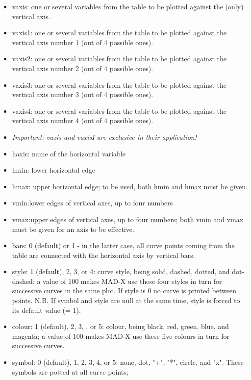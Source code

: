 \begin{itemize}
   \item vaxis: one or several variables from the table to be plotted
     against the (only) vertical axis.   
   \item vaxis1: one or several variables from the table to be plotted
     against the vertical axis number 1 (out of 4 possible ones).  
   \item vaxis2: one or several variables from the table to be plotted
     against the vertical axis number 2 (out of 4 possible ones).  
   \item vaxis3: one or several variables from the table to be plotted
     against the vertical axis number 3 (out of 4 possible ones).  
   \item vaxis4: one or several variables from the table to be plotted
     against the vertical axis number 4 (out of 4 possible ones).  
   \item \textit{Important: vaxis and vaxisI are exclusive in their
     application!} 
   \item haxis: name of the horizontal variable 
   \item hmin: lower horizontal edge 
   \item hmax: upper horizontal edge; to be used, both hmin and hmax
     must be given.   
   \item vmin:lower edges of vertical axes, up to four numbers 
   \item vmax:upper edges of vertical axes, up to four numbers; both
     vmin and vmax must be given for an axis to be effective.   
   \item bars: 0 (default) or 1 - in the latter case, all curve points
     coming from the table are connected with the horizontal axis by
     vertical bars.   
   \item style: 1 (default), 2, 3, or 4: curve style, being solid,
     dashed, dotted, and dot-dashed; a value of 100 makes MAD-X use
     these four styles in turn for successive curves in the same
     plot. If style is 0 no curve is printed between points.  N.B. If
     symbol and style are null at the same time, style is forced to its
     default value (= 1).   
   \item colour: 1 (default), 2, 3, , or 5: colour, being black, red,
     green, blue, and magenta; a value of 100 makes MAD-X use these five
     colours in turn for successive curves.  
   \item symbol: 0 (default), 1, 2, 3, 4, or 5: none, dot, "+", "*",
     circle, and "x". These symbols are potted at all curve points;

\end{itemize}

